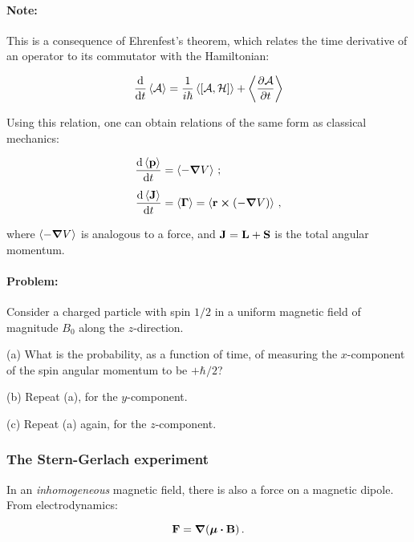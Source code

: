 \documentclass[12pt, titlepage]{article}
\newcommand{\exv}[1]{\left\langle #1 \right\rangle}
\begin{document}
\begin{mdframed}
\paragraph*{Note:} This is a consequence of Ehrenfest's theorem, which relates the time derivative of an operator to its commutator with the Hamiltonian:

\begin{equation}
	\dv{t}\exv{\mathcal{A}} = \frac{1}{i\hbar}\exv{\comm{\mathcal{A}}{\mathcal{H}}} + \exv{\pdv{\mathcal{A}}{t}}
\end{equation}

Using this relation, one can obtain relations of the same form as classical mechanics:

\begin{align}
	\dv{\exv{\vb{p}}}{t} &= \exv{-\grad{V}} \,; \\[4pt]
	\dv{\exv{\vb{J}}}{t} &= \exv{\vb{\Gamma}} = \exv{\vb{r}\cross(-\grad{V})} \,,
\end{align}

where $\exv{-\grad{V}}$ is analogous to a force, and $\vb{J} = \vb{L} + \vb{S}$ is the total angular momentum. 
\end{mdframed}

\begin{mdframed}[backgroundcolor=gray!20]
\paragraph*{Problem:} Consider a charged particle with spin $1/2$ in a uniform magnetic field of magnitude $B_0$ along the $z$-direction. 

(a) What is the probability, as a function of time, of measuring the $x$-component of the spin angular momentum to be $+\hbar/2$?

(b) Repeat (a), for the $y$-component.

(c) Repeat (a) again, for the $z$-component.
\end{mdframed}

\subsubsection{The Stern-Gerlach experiment}
In an \textit{inhomogeneous} magnetic field, there is also a force on a magnetic dipole. From electrodynamics:

\begin{equation}
	\vb{F} = \grad(\vb*{\mu}\vdot\vb{B}) \,.
\end{equation}
\end{document}
